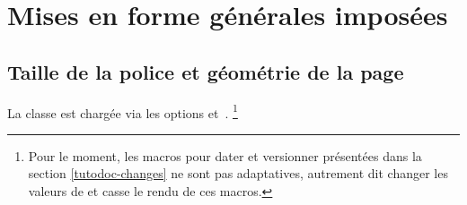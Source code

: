 \documentclass{tutodoc}
\begin{document}
\section{Mises en forme générales imposées}

\subsection{Taille de la police et géométrie de la page}

La classe  est chargée via les options  et \,.%
\footnote{
	Pour le moment, les macros pour dater et versionner présentées dans la section  \ref{tutodoc-changes} ne sont pas adaptatives, autrement dit changer les valeurs de  et  casse le rendu de ces macros.
}
\end{document}

